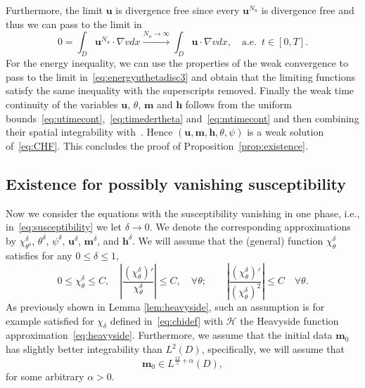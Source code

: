 \documentclass[10pt,letterpaper,twoside]{amsart}
\theoremstyle{definition}{\newtheorem{definition}[lemma]{Definition}}
\theoremstyle{note}{\newtheorem{claim}{Claim}[section]
\newtheorem*{claim*}{Claim}}
\numberwithin{equation}{section}
\newcommand{\dom}{D}
\newcommand{\Grad}{\nabla}
\newcommand{\bu}{\mathbf{u}}
\newcommand{\bm}{\mathbf{m}}
\newcommand{\buc}{\mathbf{u}^{N_u}}
\newcommand{\bh}{\mathbf{h}}
\newcommand{\bud}{\mathbf{u}^\delta}
\newcommand{\bmd}{\mathbf{m}^\delta}
\newcommand{\bhd}{\mathbf{h}^\delta}
\newcommand{\td}{\theta^\delta}
\begin{document}
 Furthermore, the limit $\bu$ is divergence free since every $\buc$ is divergence free and thus we can pass to the limit in
 \begin{equation*}
 	0 = \int_{\dom}\buc\cdot \Grad v dx \stackrel{N_u\to \infty}{\longrightarrow}\int_{\dom} \bu\cdot \Grad v dx, \quad \text{a.e. }\, t\in [0,T].
 \end{equation*}
 For the energy inequality, we can use the properties of the weak convergence to pass to the limit in~\eqref{eq:energyuthetadisc3} and obtain that the limiting functions satisfy the same inequality with the superscripts removed. Finally the weak time continuity of the variables $\bu$, $\theta$, $\bm$ and $\bh$ follows from the uniform bounds~\eqref{eq:utimecont},~\eqref{eq:timedertheta} and~\eqref{eq:mtimecont} and then combining their spatial integrability with~\cite[Lemma II.5.9]{Boyer2012}.
Hence $(\bu,\bm,\bh,\theta,\psi)$ is a weak solution of~\eqref{eq:CHF}.
 This concludes the proof of Proposition~\ref{prop:existence}.

\subsection{Existence for possibly vanishing susceptibility}
\label{sec:vanishing-mag}
Now we consider the equations with the susceptibility vanishing in one phase, i.e., in~\eqref{eq:susceptibility} we let $\delta\to 0$. We denote the corresponding approximations by $\chi_{\theta^\delta}^\delta$, $\theta^\delta$, $\psi^{\delta}$, $\bud$, $\bmd$, and $\bhd$.
We will assume that the (general) function $\chi_\theta^\delta$ satisfies  for any $0\leq  \delta\leq 1$,
\begin{equation}\label{eq:conddelta}
	0\leq \chi_\td\leq C,\quad \left|\frac{(\chi^\delta_{\theta})'}{\chi^\delta_{\theta}}\right|\leq C,\quad \forall\theta; \quad\quad   \left|\frac{(\chi_\theta^\delta)'}{(\chi^\delta_{\theta})^2}\right|\leq C \quad \forall \theta.
\end{equation} 
As previously shown in Lemma \ref{lem:heavyside}, such an assumption is for example satisfied for $\chi_\delta$ defined in~\eqref{eq:chidef} with $\mathcal{H}$ the Heavyside function approximation~\eqref{eq:heavyside}. 
Furthermore, we assume that the initial data $\bm_0$ has slightly better integrability than $L^2(\dom)$, specifically, we will assume that
\begin{equation}\label{eq:L52}
	\bm_0\in L^{\frac{12}{5}+\alpha}(\dom),
\end{equation}
for some arbitrary $\alpha>0$.
\end{document}
